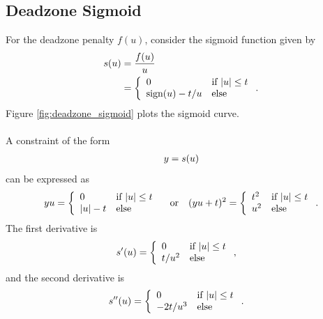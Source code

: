 \documentclass{article}
\begin{document}
    \clearpage

    \subsection{Deadzone Sigmoid}
        For the deadzone penalty $f(u)$, consider the sigmoid function given by
        \begin{align}
            s(u)&=\frac{f(u)}{u}\nonumber\\
            &=
            \left\{\begin{array}{lllllllllllllllllll}0 & \text{if $|u|\leq t$} \\ \text{sign}(u)-t/u & \text{else}\end{array}\right..
        \end{align}
        Figure \ref{fig:deadzone_sigmoid} plots the sigmoid curve. 
        \\
        \\
        A constraint of the form
        \begin{align*}
            y=s(u)
        \end{align*}
        can be expressed as
        \begin{align*}
            yu=
            \left\{\begin{array}{lllllllllllllllllll}0 & \text{if $|u|\leq t$} \\ |u|-t & \text{else}\end{array}\right.\quad\text{or}\quad
            (yu+t)^2=
            \left\{\begin{array}{lllllllllllllllllll}t^2 & \text{if $|u|\leq t$} \\ u^2 & \text{else}\end{array}\right.
            .
        \end{align*}
        The first derivative is
        \begin{align*}
            s'(u)
            &=
            \left\{\begin{array}{lllllllllllllllllll}0 & \text{if $|u|\leq t$} \\ t/u^2 & \text{else}\end{array}\right.,
        \end{align*}
        and the second derivative is
        \begin{align*}
            s''(u)
            &=
            \left\{\begin{array}{lllllllllllllllllll}0 & \text{if $|u|\leq t$} \\ -2t/u^3 & \text{else}\end{array}\right..
        \end{align*}
\end{document}
